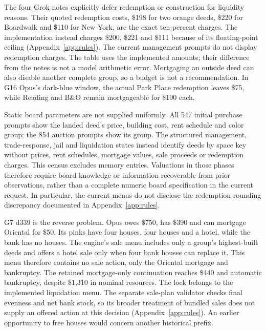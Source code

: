 
The four Grok notes explicitly defer redemption or construction for liquidity reasons. Their quoted redemption costs, \$198 for two orange deeds, \$220 for Boardwalk and \$110 for New York, are the exact ten-percent charges. The implementation instead charges \$200, \$221 and \$111 because of its floating-point ceiling (Appendix~\ref{app:rules}). The current management prompts do not display redemption charges. The table uses the implemented amounts; their difference from the notes is not a model arithmetic error. Mortgaging an outside deed can also disable another complete group, so a budget is not a recommendation. In G16 Opus's dark-blue window, the actual Park Place redemption leaves \$75, while Reading and B\&O remain mortgageable for \$100 each.

Static board parameters are not supplied uniformly. All 547 initial purchase prompts show the landed deed's price, building cost, rent schedule and color group; the 854 auction prompts show its group. The structured management, trade-response, jail and liquidation states instead identify deeds by space key without prices, rent schedules, mortgage values, sale proceeds or redemption charges. This census excludes memory entries. Valuations in those phases therefore require board knowledge or information recoverable from prior observations, rather than a complete numeric board specification in the current request. In particular, the current menus do not disclose the redemption-rounding discrepancy documented in Appendix~\ref{app:rules}.

G7 d339 is the reverse problem. Opus owes \$750, has \$390 and can mortgage Oriental for \$50. Its pinks have four houses, four houses and a hotel, while the bank has no houses. The engine's sale menu includes only a group's highest-built deeds and offers a hotel sale only when four bank houses can replace it. This menu therefore contains no sale action, only the Oriental mortgage and bankruptcy. The retained mortgage-only continuation reaches \$440 and automatic bankruptcy, despite \$1,310 in nominal resources. The lock belongs to the implemented liquidation menu. The separate sale-plan validator checks final evenness and net bank stock, so its broader treatment of bundled sales does not supply an offered action at this decision (Appendix~\ref{app:rules}). An earlier opportunity to free houses would concern another historical prefix.

